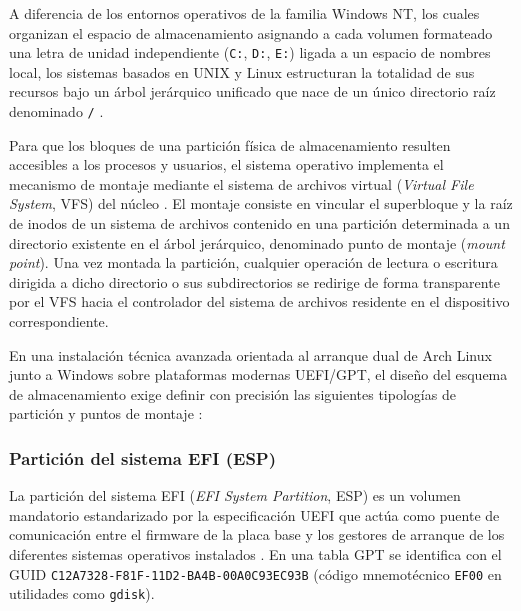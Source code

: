 \documentclass[12pt]{article}
\begin{document}
A diferencia de los entornos operativos de la familia Windows NT, los cuales organizan el espacio de almacenamiento asignando a cada volumen formateado una letra de unidad independiente (\texttt{C:}, \texttt{D:}, \texttt{E:}) ligada a un espacio de nombres local, los sistemas basados en UNIX y Linux estructuran la totalidad de sus recursos bajo un árbol jerárquico unificado que nace de un único directorio raíz denominado \texttt{/} \parencite{fhs2015specification}. 

Para que los bloques de una partición física de almacenamiento resulten accesibles a los procesos y usuarios, el sistema operativo implementa el mecanismo de montaje mediante el sistema de archivos virtual (\textit{Virtual File System}, VFS) del núcleo \parencite[\S 11.9.3, pp.\ 398--399]{silberschatz2006fundamentos}. El montaje consiste en vincular el superbloque y la raíz de inodos de un sistema de archivos contenido en una partición determinada a un directorio existente en el árbol jerárquico, denominado punto de montaje (\textit{mount point}). Una vez montada la partición, cualquier operación de lectura o escritura dirigida a dicho directorio o sus subdirectorios se redirige de forma transparente por el VFS hacia el controlador del sistema de archivos residente en el dispositivo correspondiente.

En una instalación técnica avanzada orientada al arranque dual de Arch Linux junto a Windows sobre plataformas modernas UEFI/GPT, el diseño del esquema de almacenamiento exige definir con precisión las siguientes tipologías de partición y puntos de montaje \parencite{arch2024install}:

\subsubsection{Partición del sistema EFI (ESP)}

La partición del sistema EFI (\textit{EFI System Partition}, ESP) es un volumen mandatorio estandarizado por la especificación UEFI que actúa como puente de comunicación entre el firmware de la placa base y los gestores de arranque de los diferentes sistemas operativos instalados \parencite{uefi2024specification}. En una tabla GPT se identifica con el GUID \texttt{C12A7328-F81F-11D2-BA4B-00A0C93EC93B} (código mnemotécnico \texttt{EF00} en utilidades como \texttt{gdisk}). 
\end{document}
